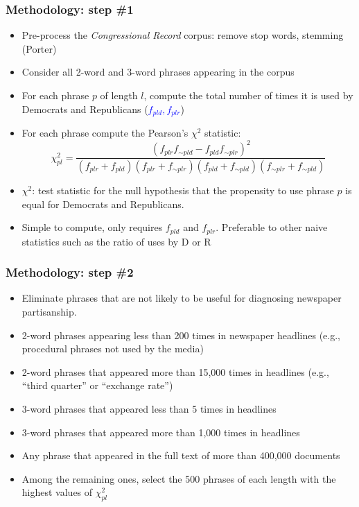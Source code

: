 \documentclass[english]{beamer}
\begin{document}
\begin{frame}
\frametitle{Methodology: step \#1}
\begin{itemize}
\setlength{\itemsep}{0.8em}

\item{Pre-process the \textit{Congressional Record} corpus: remove stop words, stemming (Porter)}
\pause
\item{Consider all 2-word and 3-word phrases appearing in the corpus}
\pause
\item{For each phrase $p$ of length $l$, compute the total number of times it is used by Democrats and Republicans (\textcolor{blue}{$f_{pld}, f_{plr}$})}
\pause
\item{For each phrase compute the Pearson's $\chi^{2}$ statistic: \\
$$ \chi_{pl}^2 = \frac{(f_{plr}f_{\sim pld} - f_{pld}f_{\sim plr})^2}{(f_{plr}+f_{pld})(f_{plr}+f_{\sim plr})(f_{pld}+f_{\sim pld})(f_{\sim plr}+f_{\sim pld})} $$
}

\pause
\item{$\chi^{2}$: test statistic for the null hypothesis that the propensity to use phrase $p$ is equal for Democrats and Republicans.}

\pause
\item{Simple to compute, only requires $f_{pld}$ and $f_{plr}$. Preferable to other naive statistics such as the ratio of uses by D or R}

\end{itemize}
\end{frame}

\begin{frame}
\frametitle{Methodology: step \#2}
\begin{itemize}
\setlength{\itemsep}{0.8em}

\item{Eliminate phrases that are not likely to be useful for diagnosing newspaper partisanship.}
\pause
\item{2-word phrases appearing less than 200 times in newspaper headlines (e.g., procedural phrases not used by the media)}
\item{2-word phrases that appeared more than 15,000 times in headlines (e.g., ``third quarter'' or ``exchange rate'')}
\item{3-word phrases that appeared less than 5 times in headlines}
\item{3-word phrases that appeared more than 1,000 times in headlines}
\item{Any phrase that appeared in the full text of more than 400,000 documents}
\pause
\item{Among the remaining ones, select the 500 phrases of each length with the highest values of $\chi_{pl}^2$}
\end{itemize}
\end{frame}
\end{document}
